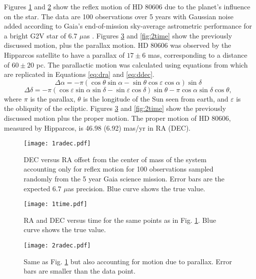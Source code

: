 \documentclass[preprint]{aastex}
\begin{document}
Figures \ref{fig:1radec} and \ref{fig:1time} show the reflex motion of HD 80606 due to the planet's influence on the star. The data are 100 observations over 5 years with Gaussian noise added according to Gaia's end-of-mission sky-average astrometric performance for a bright G2V star of 6.7 $\mu$as \citep{gaia}. 
Figures \ref{fig:2radec} and \ref{fig:2time} show the previously discussed motion, plus the parallax motion. HD 80606 was observed by the Hipparcos satellite to have a parallax of $17\pm6$ mas, corresponding to a distance of $60\pm20$ pc. The parallactic motion was calculated using equations from \citet{parallax} which are replicated in Equations \ref{eq:dra} and \ref{eq:ddec}. 
\begin{equation}
    \Delta\alpha=-\pi(\cos\theta\sin\alpha-\sin\theta\cos\varepsilon\cos\alpha)\sin\delta
    \label{eq:dra}
\end{equation}
\begin{equation}
    \Delta\delta=-\pi(\cos\varepsilon\sin\alpha\sin\delta-\sin\varepsilon\cos\delta)\sin\theta-\pi\cos\alpha\sin\delta\cos\theta,
    \label{eq:ddec}
\end{equation}
where $\pi$ is the parallax, $\theta$ is the longitude of the Sun seen from earth, and $\varepsilon$ is the obliquity of the ecliptic.
Figures \ref{fig:2radec} and \ref{fig:2time} show the previously discussed motion plus the proper motion. The proper motion of HD 80606, measured by Hipparcos, is 46.98 (6.92) mas/yr in RA (DEC).

\begin{figure}
\begin{center}
    \texttt{[image: 1radec.pdf]}
    \caption{DEC versus RA offset from the center of mass of the system accounting only for reflex motion for 100 observations sampled randomly from the 5 year Gaia science mission. Error bars are the expected 6.7 $\mu$as precision. Blue curve shows the true value.}
    \label{fig:1radec}
\end{center}
\end{figure}

\begin{figure}
\begin{center}
    \texttt{[image: 1time.pdf]}
    \caption{RA and DEC versus time for the same points as in Fig. \ref{fig:1radec}. Blue curve shows the true value.}
    \label{fig:1time}
\end{center}
\end{figure}

\begin{figure}
\begin{center}
    \texttt{[image: 2radec.pdf]}
    \caption{Same as Fig. \ref{fig:1radec} but also accounting for motion due to parallax. Error bars are smaller than the data point.}
    \label{fig:2radec}
\end{center}
\end{figure}
\end{document}
